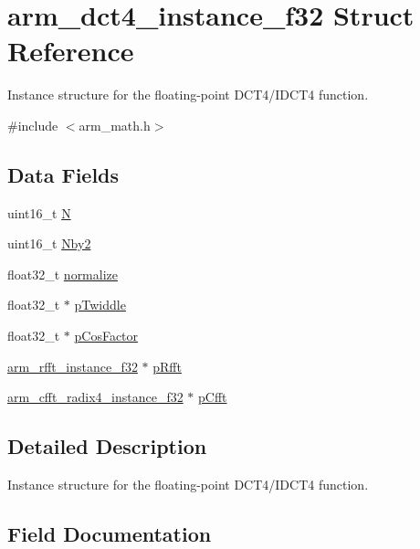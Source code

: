 \hypertarget{structarm__dct4__instance__f32}{}\section{arm\+\_\+dct4\+\_\+instance\+\_\+f32 Struct Reference}
\label{structarm__dct4__instance__f32}


Instance structure for the floating-\/point D\+C\+T4/\+I\+D\+C\+T4 function.  




{\ttfamily \#include $<$arm\+\_\+math.\+h$>$}

\subsection*{Data Fields}
\begin{DoxyCompactItemize}
\item 
uint16\+\_\+t \hyperlink{structarm__dct4__instance__f32_a37d49571fe35012087153c093705cd11}{N}
\item 
uint16\+\_\+t \hyperlink{structarm__dct4__instance__f32_afa64b1618089e35c2b55cff71cb29715}{Nby2}
\item 
float32\+\_\+t \hyperlink{structarm__dct4__instance__f32_a1bf2ed86ef2c3dd83af606bb3f520f2a}{normalize}
\item 
float32\+\_\+t $\ast$ \hyperlink{structarm__dct4__instance__f32_aca581481fccdff0f557f54a3ef20d967}{p\+Twiddle}
\item 
float32\+\_\+t $\ast$ \hyperlink{structarm__dct4__instance__f32_abd73b9d7fb4951ba086e4820c2a48eb0}{p\+Cos\+Factor}
\item 
\hyperlink{structarm__rfft__instance__f32}{arm\+\_\+rfft\+\_\+instance\+\_\+f32} $\ast$ \hyperlink{structarm__dct4__instance__f32_ad4cd7c85eea3f7c5fff4630bbd979e6a}{p\+Rfft}
\item 
\hyperlink{structarm__cfft__radix4__instance__f32}{arm\+\_\+cfft\+\_\+radix4\+\_\+instance\+\_\+f32} $\ast$ \hyperlink{structarm__dct4__instance__f32_ab7bd4d374a1780dea50efd3e7ac220be}{p\+Cfft}
\end{DoxyCompactItemize}


\subsection{Detailed Description}
Instance structure for the floating-\/point D\+C\+T4/\+I\+D\+C\+T4 function. 

\subsection{Field Documentation}
\mbox{\label{structarm__dct4__instance__f32_a37d49571fe35012087153c093705cd11}} 
